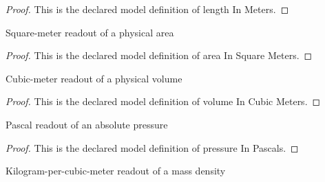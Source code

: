 \begin{proof}
  This is the declared model definition of length In Meters.
\end{proof}
\begin{definition}
  \label{def:physics:phyx-mini-0364:phyxminiproblems-problemphyxmini0364-areainsquaremeters}
  Square-meter readout of a physical area
\end{definition}
\begin{proof}
  This is the declared model definition of area In Square Meters.
\end{proof}
\begin{definition}
  \label{def:physics:phyx-mini-0364:phyxminiproblems-problemphyxmini0364-volumeincubicmeters}
  Cubic-meter readout of a physical volume
\end{definition}
\begin{proof}
  This is the declared model definition of volume In Cubic Meters.
\end{proof}
\begin{definition}
  \label{def:physics:phyx-mini-0364:phyxminiproblems-problemphyxmini0364-pressureinpascals}
  Pascal readout of an absolute pressure
\end{definition}
\begin{proof}
  This is the declared model definition of pressure In Pascals.
\end{proof}
\begin{definition}
  \label{def:physics:phyx-mini-0364:phyxminiproblems-problemphyxmini0364-densityinkilogramspercubicmeter}
  Kilogram-per-cubic-meter readout of a mass density
\end{definition}
